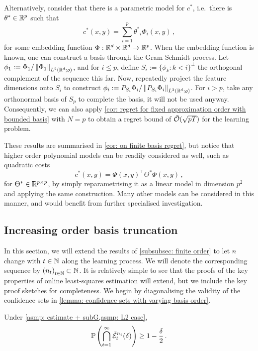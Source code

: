 Alternatively, consider that there is a parametric model for $c^*$, i.e.\ there is $\theta^*\in\mathbb{R}^p$ such that 
\[
    c^*(x,y) = \sum_{i=1}^p {\theta^*}_i\Phi_i(x,y)\,,
\]
for some embedding function $\Phi:\mathbb{R}^d\times\mathbb{R}^d\to\mathbb{R}^p$. When the embedding function is known, one can construct a basis through the Gram-Schmidt process. Let $\phi_1:=\Phi_1/\left\lVert\Phi_1\right\rVert_{L^2(\mathbb{R}^d;\varrho)}$, and for $i\le p$, define $S_i:={\{\phi_k:k<i\}}^\perp$ the orthogonal complement of the sequence this far. Now, repeatedly project the feature dimensions onto $S_i$ to construct $\phi_i:=P_{S_i}\Phi_i/\left\lVert P_{S_i}\Phi_i\right\rVert_{L^2(\mathbb{R}^d;\varrho)}$. For $i>p$, take any orthonormal basis of $S_p$ to complete the basis, it will not be used anyway. Consequently, we can also apply \cref{cor: regret for fixed approximation order with bounded basis} with $N=p$ to obtain a regret bound of $\tilde{\mathcal{O}}(\sqrt{pT})$ for the learning problem.


These results are summarised in \cref{cor: on finite basis regret}, but notice that higher order polynomial models can be readily considered as well, such as quadratic costs 
\[
    c^*(x,y) = {\Phi(x,y)}^\top\Theta^*\Phi(x,y)\,,
\]
for $\Theta^*\in\mathbb{R}^{p\times p}$, by simply reparametrising it as a linear model in dimension $p^2$ and applying the same construction. Many other models can be considered in this manner, and would benefit from further specialised investigation.

\CorOnFiniteBasis*

\subsection{Increasing order basis truncation}\label{subsubsec: increasing order}

In this section, we will extend the results of \cref{subsubsec: finite order} to let $n$ change with $t\in\mathbb{N}$ along the learning process. We will denote the corresponding sequence by ${(n_t)}_{t\in\mathbb{N}}\subset\mathbb{N}$. It is relatively simple to see that the proofs of the key properties of online least-squares estimation will extend, but we include the key proof sketches for completeness. We begin by diagonalising the validity of the confidence sets in \cref{lemma: confidence sets with varying basis order}.

\begin{lemma}\label{lemma: confidence sets with varying basis order}
    Under \cref{asmp: estimate + subG,asmp: L2 case},
\[
    \mathbb{P}\left(\bigcap_{t=1}^\infty \tilde{\mathcal{E}}_t^{n_t}(\delta)\right)\ge 1-\frac\delta2\,.
\]
\end{lemma}

